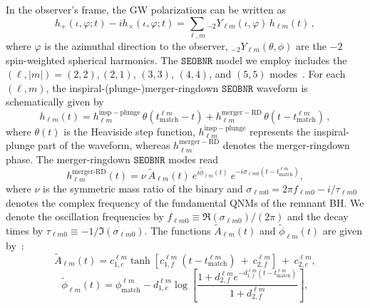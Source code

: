 \documentclass[twocolumn,prd,superscriptaddress,amsfonts,amssymb,amsmath,preprintnumbers]{revtex4-1}
\newcommand{\SEOB}{\texttt{SEOBNR}}
\begin{document}
In the observer's frame, the GW polarizations can be written as 
%
\begin{equation}
h_+(\iota,\varphi;t ) - i h_\times(\iota,\varphi;t) = \sum_{\ell, m} {}_{-\!2}Y_{\ell m}(\iota,\varphi)\, h_{\ell m}(t)\,,
\end{equation}
%
where $\varphi$ is the azimuthal direction to the observer, ${}_{-\!2}Y_{\ell m}(\theta,\phi)$ are the $-2$ spin-weighted spherical harmonics. The $\SEOB$ model we employ includes the $(\ell, |m|)=(2,2),(2,1)$, $(3,3)$, $(4,4)$, and $(5,5)$ modes~\cite{Cotesta:2018fcv}. For each $(\ell, m)$, the inspiral-(plunge-)merger-ringdown $\SEOB$ waveform is schematically given by
%
\begin{equation}
h_{\ell m}(t) = h_{\ell m}^\mathrm{insp-plunge}\, \theta(t_\mathrm{match}^{\ell m} - t) + h_{\ell m}^\mathrm{merger-RD}\,\theta(t-t_\mathrm{match}^{\ell m})\,,
\end{equation}
where $\theta(t)$ is the Heaviside step function, $h_{\ell m}^\mathrm{insp-plunge}$ represents the inspiral-plunge part of the waveform, whereas $h_{\ell m}^\mathrm{merger-RD}$ denotes the merger-ringdown phase.   
The merger-ringdown $\SEOB$ modes read~\citep{Bohe:2016gbl,Cotesta:2018fcv}
%
\begin{equation}
\label{RD}
h_{\ell m}^{\textrm{merger-RD}}(t) = \nu \ \tilde{A}_{\ell m}(t)\ e^{i \tilde{\phi}_{\ell m}(t)} \ e^{-i \sigma_{\ell m 0}(t-t_{\textrm{match}}^{\ell m})},
\end{equation}
%
where $\nu$ is the symmetric mass ratio of the binary and $\sigma_{\ell m0} = 2\pi f_{\ell m 0} -i/\tau_{\ell m 0}$ denotes the complex frequency of the fundamental QNMs of the remnant BH. We denote the oscillation frequencies by $f_{\ell m  0}\equiv \Re(\sigma_{\ell m0})/(2\pi)$ and the decay times by $\tau_{\ell m 0}\equiv -1/\Im(\sigma_{\ell m0}) $. 
The functions $\tilde{A}_{\ell m}(t)$ and $\tilde{\phi}_{\ell m}(t)$ are given by~\cite{Bohe:2016gbl,Cotesta:2018fcv}:
%
\begin{equation}
\label{eq:ansatz_amp}
\tilde{A}_{\ell m}(t) = c_{1,c}^{\ell m} \tanh[c_{1,f}^{\ell m}\ (t-t_{\textrm{match}}^{\ell m}) \ +\ c_{2,f}^{\ell m}] \ + \ c_{2,c}^{\ell m},
\end{equation}
%
\begin{equation}
\label{eq:ansatz_phase}
\tilde{\phi}_{\ell m}(t) = \phi_{\textrm{match}}^{\ell m} - d_{1,c}^{\ell m} \log\left[\frac{1+d_{2,f}^{\ell m} e^{-d_{1,f}^{\ell m}(t-t_{\textrm{match}}^{\ell m})}}{1+d_{2,f}^{\ell m}}\right],
\end{equation}
\end{document}
